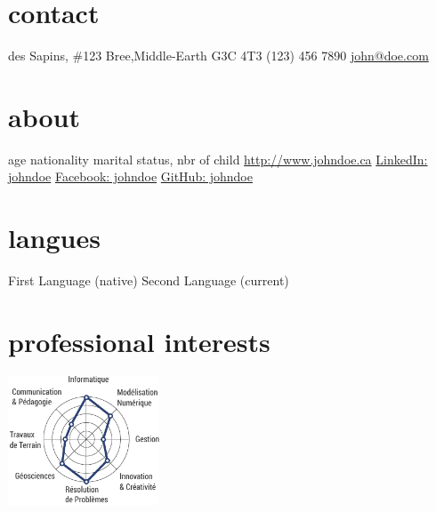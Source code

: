 \documentclass[print]{friggos-cv} %
\begin{document}


\begin{aside} %
	\section{contact}%
	    \vspace{5pt}
		\home{} des Sapins, \#123
		\hspace{0.43cm}Bree,Middle-Earth
		\hspace{0.43cm}G3C 4T3\vspace{5pt}
		\phoneb \space (123) 456 7890
		\href{}{\mail\space john@doe.com}
		\vspace{10pt}%
	\section{about}%
		\vspace{5pt}
		age
		nationality
		 marital status, nbr of child%
		\vspace{5pt}
		\href{}{\globe\hspace{0.1cm} http://www.johndoe.ca}
		\href{}{\linkedin\hspace{0.1cm} LinkedIn: johndoe}
		\href{}{\facebook\hspace{0.1cm} Facebook: johndoe}
		\href{}{\github\hspace{0.1cm} GitHub: johndoe}
		\vspace{10pt}%
	\section{langues}%
		\vspace{5pt}
		First Language (native)
		Second Language (current)
		\vspace{10pt}%
	\section{professional interests}%
		\vspace{10pt}
		\includegraphics[width=4.5cm]{prof_interests_graph}
		\vspace{5pt}%

\end{aside}
\end{document}
